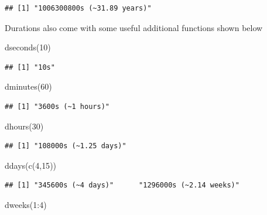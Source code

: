 \documentclass[
]{book}
\newenvironment{Shaded}{\begin{snugshade}}{\end{snugshade}}
\newcommand{\DecValTok}[1]{\textcolor[rgb]{0.00,0.00,0.81}{#1}}
\newcommand{\FunctionTok}[1]{\textcolor[rgb]{0.00,0.00,0.00}{#1}}
\newcommand{\NormalTok}[1]{#1}
\newcommand{\SpecialCharTok}[1]{\textcolor[rgb]{0.00,0.00,0.00}{#1}}
\begin{document}
\begin{verbatim}
## [1] "1006300800s (~31.89 years)"
\end{verbatim}

Durations also come with some useful additional functions shown below

\begin{Shaded}
\begin{Highlighting}[]
\FunctionTok{dseconds}\NormalTok{(}\DecValTok{10}\NormalTok{)}
\end{Highlighting}
\end{Shaded}

\begin{verbatim}
## [1] "10s"
\end{verbatim}

\begin{Shaded}
\begin{Highlighting}[]
\FunctionTok{dminutes}\NormalTok{(}\DecValTok{60}\NormalTok{)}
\end{Highlighting}
\end{Shaded}

\begin{verbatim}
## [1] "3600s (~1 hours)"
\end{verbatim}

\begin{Shaded}
\begin{Highlighting}[]
\FunctionTok{dhours}\NormalTok{(}\DecValTok{30}\NormalTok{)}
\end{Highlighting}
\end{Shaded}

\begin{verbatim}
## [1] "108000s (~1.25 days)"
\end{verbatim}

\begin{Shaded}
\begin{Highlighting}[]
\FunctionTok{ddays}\NormalTok{(}\FunctionTok{c}\NormalTok{(}\DecValTok{4}\NormalTok{,}\DecValTok{15}\NormalTok{))}
\end{Highlighting}
\end{Shaded}

\begin{verbatim}
## [1] "345600s (~4 days)"      "1296000s (~2.14 weeks)"
\end{verbatim}

\begin{Shaded}
\begin{Highlighting}[]
\FunctionTok{dweeks}\NormalTok{(}\DecValTok{1}\SpecialCharTok{:}\DecValTok{4}\NormalTok{)}
\end{Highlighting}
\end{Shaded}
\end{document}
